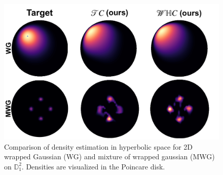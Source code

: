 \begin{figure}[t!]
     \centering
     \includegraphics[width=\linewidth]{hyperbolic_density_graphic.pdf}
     \vspace{-10pt}
     \caption{Comparison of density estimation in hyperbolic space for 2D wrapped Gaussian (WG) and mixture of wrapped gaussian (MWG) on $\mathbb{D}^2_1$. Densities are visualized in the Poincare disk.}
     \vspace{-10pt}
     \label{fig:density_estimation}
 \end{figure}

